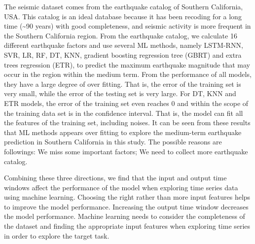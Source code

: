 \begin{enumerate}
  The seismic dataset comes from the earthquake catalog of Southern California, USA. This catalog is an ideal database because it has been recoding for a long time (\sim 90 years) with good completeness, and seismic activity is more frequent in the Southern California region. From the earthquake catalog, we calculate 16 different earthquake factors and use several ML methods, namely LSTM-RNN, SVR, LR, RF, DT, KNN, gradient boosting regression tree (GBRT) and extra trees regression (ETR), to predict the maximum earthquake magnitude that may occur in the region within the medium term. From the performance of all models, they have a large degree of over fitting. That is, the error of the training set is very small, while the error of the testing set is very large. For DT, KNN and ETR models, the error of the training set even reaches 0 and within the scope of the training data set is in the confidence interval. That is, the model can fit all the features of the training set, including noises. It can be seen from these results that ML methods appears over fitting to explore the medium-term earthquake prediction in Southern California in this study. The possible reasons are followings: We miss some important factors; We need to collect more earthquake catalog.

  Combining these three directions, we find that the input and output time windows affect the performance of the model when exploring time series data using machine learning. Choosing the right rather than more input features helps to improve the model performance. Increasing the output time window decreases the model performance. Machine learning needs to consider the completeness of the dataset and finding the appropriate input features when exploring time series in order to explore the target task.

\end{enumerate}
